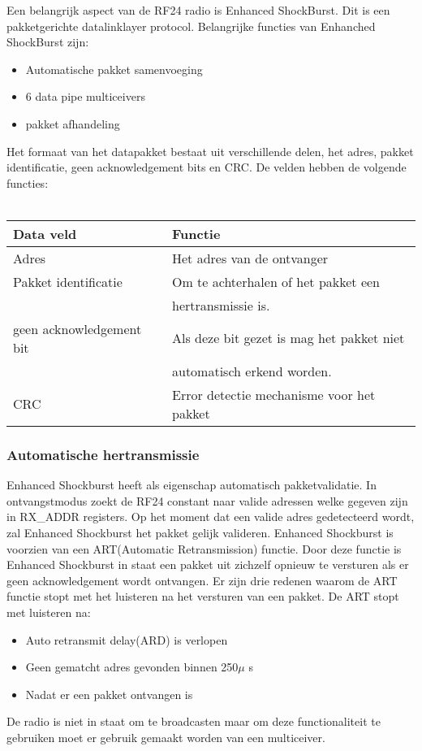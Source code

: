 \documentclass{article}
\begin{document}
Een belangrijk aspect van de RF24 radio is Enhanced ShockBurst. Dit is een pakketgerichte datalinklayer protocol.
Belangrijke functies van Enhanched ShockBurst zijn:
\begin{itemize}
	\item Automatische pakket samenvoeging
	\item 6 data pipe multiceivers
	\item pakket afhandeling
\end{itemize}
Het formaat van het datapakket bestaat uit verschillende delen, het adres, pakket identificatie, geen acknowledgement bits en CRC. De velden hebben de volgende functies:
\\
\\
\begin{tabular}{ | l | l |}
    \hline
    Data veld					& Functie	\\ \hline
    Adres						& Het adres van de ontvanger	\\ \hline
    Pakket identificatie		& Om te achterhalen of het pakket een \\
    							& hertransmissie is.\\\hline
    geen acknowledgement bit	& Als deze bit gezet is mag het pakket niet\\
    							& automatisch erkend worden.	\\ \hline
    CRC							& Error detectie mechanisme voor het pakket			\\ \hline
    \end{tabular}
    
\subsubsection{Automatische hertransmissie}

Enhanced Shockburst heeft als eigenschap automatisch pakketvalidatie. In ontvangstmodus zoekt de RF24 constant naar valide adressen welke gegeven zijn in RX\_ADDR registers. Op het moment dat een valide adres gedetecteerd wordt, zal Enhanced Shockburst het pakket gelijk valideren. Enhanced Shockburst is voorzien van een ART(Automatic Retransmission) functie. Door deze functie is Enhanced Shockburst in staat een pakket uit zichzelf opnieuw te versturen als er geen acknowledgement wordt ontvangen. Er zijn drie redenen waarom de ART functie stopt met het luisteren na het versturen van een pakket. De ART stopt met luisteren na:
\begin{itemize}
	\item Auto retransmit delay(ARD) is verlopen
	\item Geen gematcht adres gevonden binnen 250$\mu$ s
	\item Nadat er een pakket ontvangen is
\end{itemize}
De radio is niet in staat om te broadcasten maar om deze functionaliteit te gebruiken moet er gebruik gemaakt worden van een multiceiver. 
\end{document}
